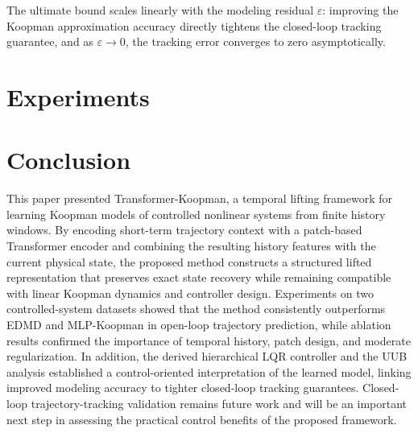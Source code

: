 \documentclass[journal]{IEEEtran}
\begin{document}
The ultimate bound scales linearly with the modeling residual $\varepsilon$: improving the Koopman approximation accuracy directly tightens the closed-loop tracking guarantee, and as $\varepsilon \to 0$, the tracking error converges to zero asymptotically.

\section{Experiments}
\label{sec:experiments}



\section{Conclusion}
\label{sec:conclusion}

This paper presented Transformer-Koopman, a temporal lifting framework for learning Koopman models of controlled nonlinear systems from finite history windows. By encoding short-term trajectory context with a patch-based Transformer encoder and combining the resulting history features with the current physical state, the proposed method constructs a structured lifted representation that preserves exact state recovery while remaining compatible with linear Koopman dynamics and controller design. Experiments on two controlled-system datasets showed that the method consistently outperforms EDMD and MLP-Koopman in open-loop trajectory prediction, while ablation results confirmed the importance of temporal history, patch design, and moderate regularization. In addition, the derived hierarchical LQR controller and the UUB analysis established a control-oriented interpretation of the learned model, linking improved modeling accuracy to tighter closed-loop tracking guarantees. Closed-loop trajectory-tracking validation remains future work and will be an important next step in assessing the practical control benefits of the proposed framework.
\end{document}
